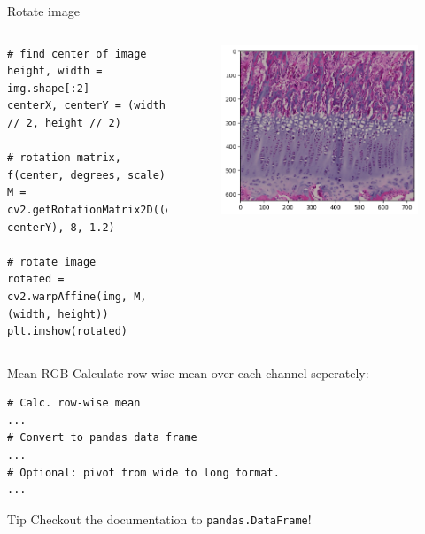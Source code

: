 \documentclass[compress%
,aspectratio=169%
]{beamer}
\begin{document}
\begin{frame}[fragile]{Rotate image}
\begin{columns}
    \begin{lstlisting}
# find center of image
height, width = img.shape[:2]
centerX, centerY = (width // 2, height // 2)

# rotation matrix, f(center, degrees, scale)
M = cv2.getRotationMatrix2D((centerX, centerY), 8, 1.2)

# rotate image
rotated = cv2.warpAffine(img, M, (width, height)) 
plt.imshow(rotated)
\end{lstlisting}
\begin{figure}
    \includegraphics[width = 1\linewidth,left]{mpimgbeamertheme/img/pig_rotated.png}
\end{figure}
\end{columns}

\end{frame}

\begin{frame}[fragile]{Mean RGB}
Calculate row-wise mean over each channel seperately:
\begin{lstlisting}
# Calc. row-wise mean
...
# Convert to pandas data frame
...
# Optional: pivot from wide to long format.
...
\end{lstlisting}
\begin{alertblock}{Tip}
Checkout the documentation to \texttt{pandas.DataFrame}!
\end{alertblock}
\end{frame}
\end{document}
